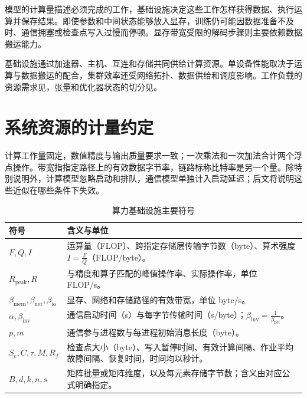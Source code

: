 \documentclass[../textbook.tex]{subfiles}
\begin{document}
\fi
{}

模型的计算量描述必须完成的工作，基础设施决定这些工作怎样获得数据、执行运算并保存结果。即使参数和中间状态能够放入显存，训练仍可能因数据准备不及时、通信拥塞或检查点写入过慢而停顿。显存带宽受限的解码步骤则主要依赖数据搬运能力。

基础设施通过加速器、主机、互连和存储共同供给计算资源。单设备性能取决于运算与数据搬运的配合，集群效率还受网络拓扑、数据供给和调度影响。工作负载的资源需求见，张量和优化器状态的切分见。

\section{系统资源的计量约定}

\begin{assumption}[性能模型的共同前提]
计算工作量固定，数值精度与输出质量要求一致；一次乘法和一次加法合计两个浮点操作。带宽指指定路径上的有效数据字节率，链路标称比特率是另一个量。除特别说明外，计算模型忽略启动和排队，通信模型单独计入启动延迟；后文将说明这些近似在哪些条件下失效。
\end{assumption}

\begin{table}[htbp]
\centering
\caption{算力基础设施主要符号}\label{tab:infra-symbols}
\begin{tabular}{ll}
\toprule
符号 & 含义与单位\\
\midrule
$F,Q,I$ & 运算量（FLOP）、跨指定存储层传输字节数（byte）、算术强度 $I=\frac{F}{Q}$（FLOP/byte）。\\
$R_{\mathrm{peak}},R$ & 与精度和算子匹配的峰值操作率、实际操作率，单位 FLOP/s。\\
$\beta_{\mathrm{mem}},\beta_{\mathrm{net}},\beta_{\mathrm{io}}$ & 显存、网络和存储路径的有效带宽，单位 byte/s。\\
$\alpha,\beta_{\mathrm{inv}}$ & 通信启动时间（s）与每字节传输时间（s/byte）；$\beta_{\mathrm{inv}}=\frac{1}{\beta_{\mathrm{net}}}$。\\
$p,m$ & 通信参与进程数与每进程初始消息长度（byte）。\\
$S_c,C,\tau,M,R_f$ & 检查点大小（byte）、写入暂停时间、有效计算间隔、作业平均故障间隔、恢复时间，时间均以秒计。\\
$B,d,k,n,s$ & 矩阵批量或矩阵维度，以及每元素存储字节数；含义由对应公式明确指定。\\
\bottomrule
\end{tabular}
\end{table}
\end{document}
